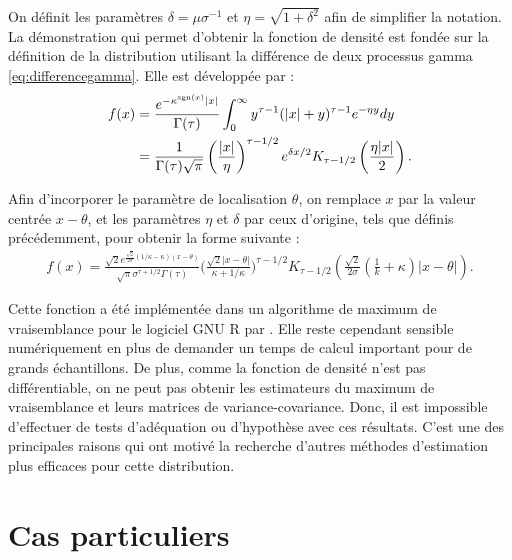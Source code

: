 On définit les paramètres $\delta = \mu\sigma^{-1}$ et $\eta =
\sqrt{1+\delta^2}$ afin de simplifier la notation.  La démonstration
qui permet d'obtenir la fonction de densité est fondée sur la
définition de la distribution utilisant la différence de deux
processus gamma \eqref{eq:differencegamma}.  Elle est développée par
\cite{kozubowski1999class}:
\begin{align}
  \label{eq:densitekotz}
  f(x) &= \frac{e^{-\kappa^{\operatorname{sgn}(x)}|x|}}{\Gamma(\tau)} \int_{0}^{\infty} y^{\tau-1}(|x|+y)^{\tau-1}e^{-\eta y} dy \nonumber\\
  &= \frac{1}{\Gamma(\tau)\sqrt{\pi}} \left(\frac{|x|}{\eta}
  \right)^{\tau-1/2} e^{\delta x/2} K_{\tau-1/2}\left(\frac{\eta
      |x|}{2}\right).
\end{align}

Afin d'incorporer le paramètre de localisation $\theta$, on remplace
$x$ par la valeur centrée $x-\theta$, et les paramètres $\eta$ et
$\delta$ par ceux d'origine, tels que définis précédemment, pour
obtenir la forme suivante \citep{kotz2001laplace}:
\begin{align}
  \label{eq:densitekotz2001}
  f(x) =
  \frac{\sqrt{2}e^{\frac{\sqrt{2}}{2\sigma}(1/\kappa-\kappa)(x-\theta)}}{\sqrt{\pi}\sigma^{\tau+1/2}\Gamma(\tau)}
  \bigg(\frac{\sqrt{2}|x-\theta|}{\kappa+1/\kappa} \bigg)^{\tau-1/2}
  K_{\tau-1/2}\left(\frac{\sqrt{2}}{2\sigma}\left(\frac{1}{k}+\kappa
    \right)|x-\theta| \right).
\end{align}

Cette fonction a été implémentée dans un algorithme de maximum de
vraisemblance pour le logiciel GNU R par
\cite{RpackageVarianceGamma}. Elle reste cependant sensible
numériquement en plus de demander un temps de calcul important pour de
grands échantillons. De plus, comme la fonction de densité n'est pas
différentiable, on ne peut pas obtenir les estimateurs du maximum de
vraisemblance et leurs matrices de variance-covariance. Donc,
il est impossible d'effectuer de tests d'adéquation ou d'hypothèse avec ces
résultats. C'est une des principales raisons qui ont motivé la
recherche d'autres méthodes d'estimation plus efficaces pour cette
distribution.

\section{Cas particuliers}
\label{sec:cas-particuliers}

